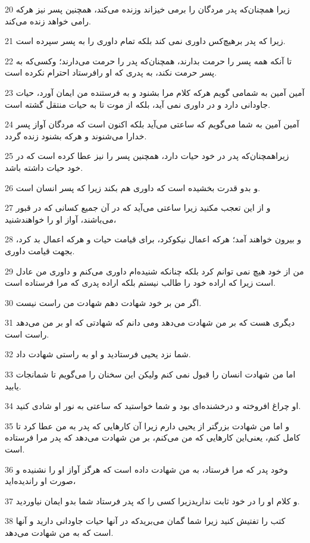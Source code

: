 \par 20 زیرا همچنان‌که پدر مردگان را برمی خیزاند وزنده می‌کند، همچنین پسر نیز هر‌که رامی خواهد زنده می‌کند.
\par 21 زیرا که پدر برهیچ‌کس داوری نمی کند بلکه تمام داوری را به پسر سپرده است.
\par 22 تا آنکه همه پسر را حرمت بدارند، همچنان‌که پدر را حرمت می‌دارند؛ وکسی‌که به پسر حرمت نکند، به پدری که او رافرستاد احترام نکرده است.
\par 23 آمین آمین به شمامی گویم هر‌که کلام مرا بشنود و به فرستنده من ایمان آورد، حیات جاودانی دارد و در داوری نمی آید، بلکه از موت تا به حیات منتقل گشته است.
\par 24 آمین آمین به شما می‌گویم که ساعتی می‌آید بلکه اکنون است که مردگان آواز پسر خدارا می‌شنوند و هر‌که بشنود زنده گردد.
\par 25 زیراهمچنان‌که پدر در خود حیات دارد، همچنین پسر را نیز عطا کرده است که در خود حیات داشته باشد.
\par 26 و بدو قدرت بخشیده است که داوری هم بکند زیرا که پسر انسان است.
\par 27 و از این تعجب مکنید زیرا ساعتی می‌آید که در آن جمیع کسانی که در قبور می‌باشند، آواز او را خواهندشنید،
\par 28 و بیرون خواهند آمد؛ هر‌که اعمال نیکوکرد، برای قیامت حیات و هر‌که اعمال بد کرد، بجهت قیامت داوری.
\par 29 من از خود هیچ نمی توانم کرد بلکه چنانکه شنیده‌ام داوری می‌کنم و داوری من عادل است زیرا که اراده خود را طالب نیستم بلکه اراده پدری که مرا فرستاده است.
\par 30 اگر من بر خود شهادت دهم شهادت من راست نیست.
\par 31 دیگری هست که بر من شهادت می‌دهد ومی دانم که شهادتی که او بر من می‌دهد راست است.
\par 32 شما نزد یحیی فرستادید و او به راستی شهادت داد.
\par 33 اما من شهادت انسان را قبول نمی کنم ولیکن این سخنان را می‌گویم تا شمانجات یابید.
\par 34 او چراغ افروخته و درخشنده‌ای بود و شما خواستید که ساعتی به نور او شادی کنید.
\par 35 و اما من شهادت بزرگتر از یحیی دارم زیرا آن کارهایی که پدر به من عطا کرد تا کامل کنم، یعنی‌این کارهایی که من می‌کنم، بر من شهادت می‌دهد که پدر مرا فرستاده است.
\par 36 وخود پدر که مرا فرستاد، به من شهادت داده است که هرگز آواز او را نشنیده و صورت او راندیده‌اید،
\par 37 و کلام او را در خود ثابت نداریدزیرا کسی را که پدر فرستاد شما بدو ایمان نیاوردید.
\par 38 کتب را تفتیش کنید زیرا شما گمان می‌بریدکه در آنها حیات جاودانی دارید و آنها است که به من شهادت می‌دهد.
